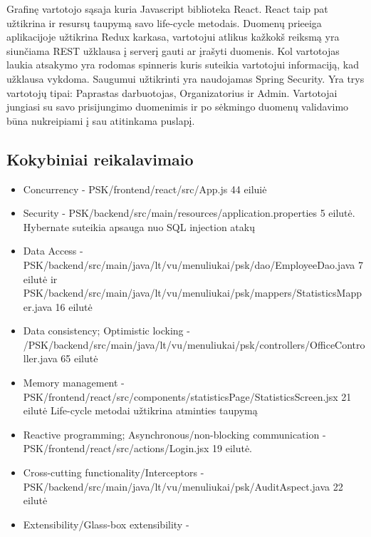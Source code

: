\documentclass{VUMIFInfKursinis}
\begin{document}
Grafinę vartotojo sąsaja kuria Javascript biblioteka React. React taip pat užtikrina ir resursų taupymą savo life-cycle metodais. Duomenų prieeiga aplikacijoje užtikrina Redux karkasa, vartotojui atlikus kažkokš reiksmą yra siunčiama REST užklausa į serverį gauti ar įrašyti duomenis. Kol vartotojas laukia atsakymo yra rodomas spinneris kuris suteikia vartotojui informaciją, kad užklausa vykdoma. Saugumui užtikrinti yra naudojamas Spring Security. Yra trys vartotojų tipai: Paprastas darbuotojas, Organizatorius ir Admin. Vartotojai jungiasi su savo prisijungimo duomenimis ir po sėkmingo duomenų validavimo būna nukreipiami į sau atitinkama puslapį.
\subsection{Kokybiniai reikalavimaio}
\begin{itemize}
	\item{Concurrency - PSK/frontend/react/src/App.js 44 eiluiė}
	\item{Security - PSK/backend/src/main/resources/application.properties  5 eilutė. Hybernate suteikia apsauga nuo SQL injection atakų }
	\item{Data Access - PSK/backend/src/main/java/lt/vu/menuliukai/psk/dao/EmployeeDao.java 7 eilutė ir PSK/backend/src/main/java/lt/vu/menuliukai/psk/mappers/StatisticsMapper.java 16 eilutė }
	\item{Data consistency; Optimistic locking - /PSK/backend/src/main/java/lt/vu/menuliukai/psk/controllers/OfficeController.java 65 eilutė}
	\item{Memory management - PSK/frontend/react/src/components/statisticsPage/StatisticsScreen.jsx 21 eilutė Life-cycle metodai užtikrina atminties taupymą}
	\item{Reactive programming; Asynchronous/non-blocking communication - PSK/frontend/react/src/actions/Login.jsx 19 eilutė.}
	\item{Cross-cutting functionality/Interceptors - PSK/backend/src/main/java/lt/vu/menuliukai/psk/AuditAspect.java 22 eilutė}
	\item{Extensibility/Glass-box extensibility - }
\end{itemize}
\end{document}

